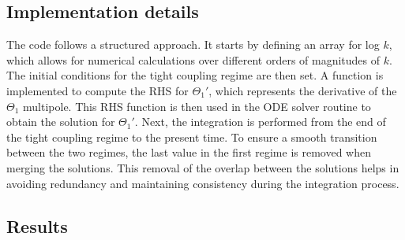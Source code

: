 \documentclass{aa}
\begin{document}
\subsection{Implementation details}
The code follows a structured approach. It starts by defining an array for log $k$, which allows for numerical calculations over different orders of magnitudes of $k$. The initial conditions for the tight coupling regime are then set. A function is implemented to compute the RHS for $\Theta_1'$, which represents the derivative of the $\Theta_1$ multipole. This RHS function is then used in the ODE solver routine to obtain the solution for $\Theta_1'$. Next, the integration is performed from the end of the tight coupling regime to the present time. To ensure a smooth transition between the two regimes, the last value in the first regime is removed when merging the solutions. This removal of the overlap between the solutions helps in avoiding redundancy and maintaining consistency during the integration process.


\subsection{Results}
\end{document}
